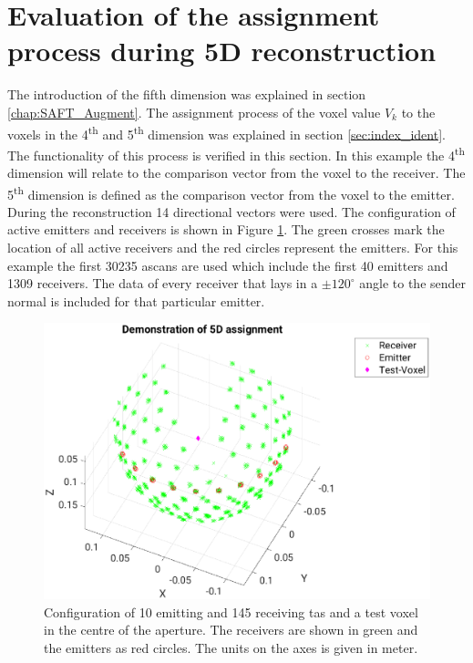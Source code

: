 \section{Evaluation of the assignment process during 5D reconstruction}
The introduction of the fifth dimension was explained in section \ref{chap:SAFT_Augment}. The assignment process of the  voxel value $V_k$ to the voxels in the 4\textsuperscript{th} and 5\textsuperscript{th} dimension was explained in section \ref{sec:index_ident}. The functionality of this process is verified in this section. In this example the 4\textsuperscript{th} dimension will relate to the comparison vector from the voxel to the receiver. The 5\textsuperscript{th} dimension is defined as the comparison vector from the voxel to the emitter. During the reconstruction 14 directional vectors were used. 
The configuration of active emitters and receivers is shown in Figure \ref{fig:res:5th_dim_over_4th_aperture}. The green crosses mark the location of all active receivers and the red circles represent the emitters. For this example the first 30235 \acp{ascan} are used which include the first 40 emitters and 1309 receivers. The data of every receiver that lays in a $\pm 120^{\circ}$ angle to the sender normal is included for that particular emitter.

\begin{figure}[H]
    \centering
    \includegraphics[width=0.89\linewidth]{Graphics/Results/4d_5d/5thDim_over_4thDim_150_150_150_apertur.eps}
    \caption{Configuration of 10 emitting and 145 receiving \ac{tas} and a test voxel in the centre of the aperture. The receivers are shown in green and the emitters as red circles. The units on the axes is given in meter. }
    \label{fig:res:5th_dim_over_4th_aperture}
\end{figure}

